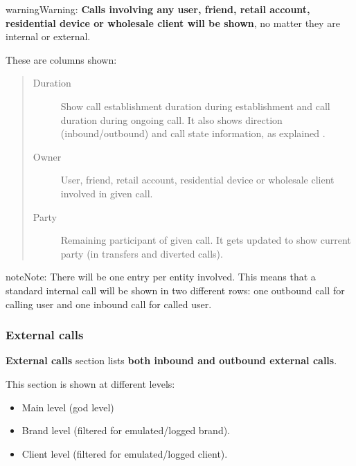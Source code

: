 \documentclass[letterpaper,10pt,english]{sphinxmanual}
\begin{document}
\begin{notice}{warning}{Warning:}
\textbf{Calls involving any user, friend, retail account, residential device or wholesale client will be shown},
no matter they are internal or external.
\end{notice}

These are columns shown:
\begin{quote}
\begin{description}
\item[{Duration}] \leavevmode
Show call establishment duration during establishment and call duration during ongoing call. It also shows
direction (inbound/outbound) and call state information, as explained {\hyperref[administration_portal/platform/active_calls:call\string-state]{}}.

\item[{Owner}] \leavevmode
User, friend, retail account, residential device or wholesale client involved in given call.

\item[{Party}] \leavevmode
Remaining participant of given call. It gets updated to show current party (in transfers and diverted calls).

\end{description}
\end{quote}

\begin{notice}{note}{Note:}
There will be one entry per entity involved. This means that a standard internal call will be shown
in two different rows: one outbound call for calling user and one inbound call for called user.
\end{notice}


\subsubsection{External calls}
\label{administration_portal/client/vpbx/calls/external_calls::doc}\label{administration_portal/client/vpbx/calls/external_calls:external-calls}
\textbf{External calls} section lists \textbf{both inbound and outbound external calls}.

This section is shown at different levels:
\begin{itemize}
\item {} 
Main level (god level)

\item {} 
Brand level (filtered for emulated/logged brand).

\item {} 
Client level (filtered for emulated/logged client).

\end{itemize}
\end{document}
